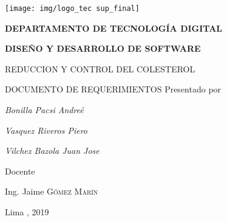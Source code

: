 \begin{titlepage}
	\centering
	\texttt{[image: img/logo\_tec	sup\_final]}\par\vspace{1cm}
	\vspace{0.30cm}	
	{\scshape\large\bfseries DEPARTAMENTO DE TECNOLOG\'IA DIGITAL \par}
	\vspace{0.60cm}	
	{\scshape\large\bfseries DISEÑO Y DESARROLLO DE SOFTWARE  \par}
	\vspace{2.00cm}		
	{\large\large REDUCCION Y CONTROL DEL COLESTEROL \par}
	\vspace{0.60cm}
	{\scshape\large DOCUMENTO DE REQUERIMIENTOS }
	\vspace{0.60cm}
	\vfill
	Presentado por \par
	{\large\itshape { Bonilla Pacsi Andreé }\par}
	\vspace{0.30cm}
	{\large\itshape { Vasquez Riveros Piero  }\par}
	\vspace{0.30cm}
	{\large\itshape { Vilchez Bazola Juan Jose }\par}
	\vspace{0.30cm}
	\vfill
	Docente \par
	Ing. Jaime  \textsc{ Gómez Marín}
	
  \vspace{0.30cm}
	\vfill
        {\large Lima , 2019 \par}
\end{titlepage}

